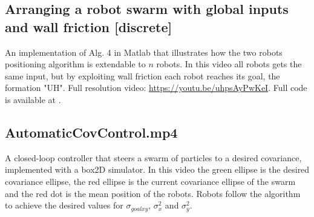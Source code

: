 \documentclass[conference]{IEEEtran}
\begin{document}
\subsection{Arranging a robot swarm with global inputs and wall friction [discrete] }
An implementation of Alg. 4  in {\sc Matlab} that illustrates how the two robots positioning algorithm is extendable to $n$ robots. In this video all  robots gets the same input, but by exploiting wall friction each robot reaches its goal, the formation "UH".
Full resolution video: \url{https://youtu.be/uhpsAyPwKeI}.
Full code is available at \citet{Arun2015}.


\subsection{AutomaticCovControl.mp4}
A closed-loop controller that steers a swarm of particles to a desired covariance,  implemented with a box2D simulator. In this video the green ellipse is the desired covariance ellipse, the red ellipse is the current covariance ellipse of the swarm and the red dot is the mean position of the robots. Robots follow the algorithm to achieve the desired values for $\sigma_{goalxy}$, $\sigma_x^2$ and $\sigma_y^2$.

\end{document}
